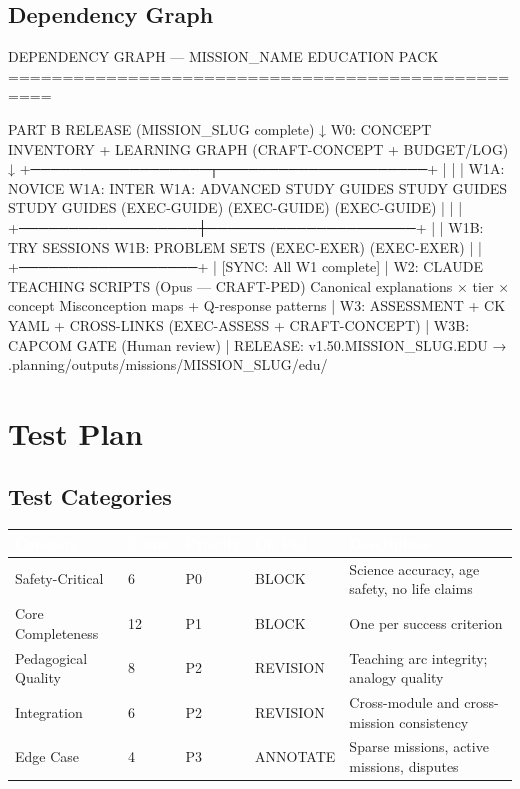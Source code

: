 \documentclass[11pt,letterpaper]{article}
\newcommand{\tableheader}[1]{\textbf{\sffamily\textcolor{white}{#1}}}
\begin{document}
\subsection{Dependency Graph}

\begin{asciibox}
DEPENDENCY GRAPH — {MISSION_NAME} EDUCATION PACK
==================================================

PART B RELEASE ({MISSION_SLUG} complete)
  ↓
W0: CONCEPT INVENTORY + LEARNING GRAPH
    (CRAFT-CONCEPT + BUDGET/LOG)
  ↓
  +──────────────────┬─────────────────────+
  |                  |                     |
W1A: NOVICE       W1A: INTER          W1A: ADVANCED
 STUDY GUIDES      STUDY GUIDES         STUDY GUIDES
 (EXEC-GUIDE)      (EXEC-GUIDE)         (EXEC-GUIDE)
  |                  |                     |
  +──────────────────┼─────────────────────+
  |                  |
W1B: TRY SESSIONS  W1B: PROBLEM SETS
     (EXEC-EXER)        (EXEC-EXER)
  |                  |
  +──────────────────+
         |
  [SYNC: All W1 complete]
         |
  W2: CLAUDE TEACHING SCRIPTS (Opus — CRAFT-PED)
      Canonical explanations × tier × concept
      Misconception maps + Q-response patterns
         |
  W3: ASSESSMENT + CK YAML + CROSS-LINKS
      (EXEC-ASSESS + CRAFT-CONCEPT)
         |
  W3B: CAPCOM GATE (Human review)
         |
  RELEASE: v1.50.{MISSION_SLUG}.EDU
  → .planning/outputs/missions/{MISSION_SLUG}/edu/
\end{asciibox}

\section{Test Plan}

\subsection{Test Categories}

\begin{center}
\begin{tabularx}{\textwidth}{L{3cm}C{1.5cm}C{1.5cm}L{2cm}X}
\toprule
{}
\tableheader{Category} & \tableheader{Count} & \tableheader{Priority} & \tableheader{On Fail} & \tableheader{Description} \\
\midrule
Safety-Critical & 6 & P0 & BLOCK & Science accuracy, age safety, no life claims \\
Core Completeness & 12 & P1 & BLOCK & One per success criterion \\
Pedagogical Quality & 8 & P2 & REVISION & Teaching arc integrity; analogy quality \\
Integration & 6 & P2 & REVISION & Cross-module and cross-mission consistency \\
Edge Case & 4 & P3 & ANNOTATE & Sparse missions, active missions, disputes \\
\bottomrule
\end{tabularx}
\end{center}
\end{document}
